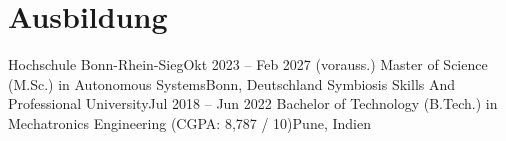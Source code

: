 \section{Ausbildung}
\resumeSubHeadingListStart
    \resumeSubheading
      {Hochschule Bonn-Rhein-Sieg}{Okt 2023 -- Feb 2027 (vorauss.)}
      {Master of Science (M.Sc.) in Autonomous Systems}{Bonn, Deutschland}
      \resumeItemListStart
      \resumeItemListEnd
    \resumeSubheading
      {Symbiosis Skills And Professional University}{Jul 2018 -- Jun 2022}
      {Bachelor of Technology (B.Tech.) in Mechatronics Engineering (CGPA: 8,787 / 10)}{Pune, Indien}
      \resumeItemListStart
      \resumeItemListEnd
\resumeSubHeadingListEnd
